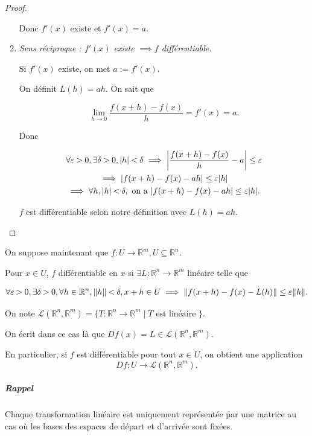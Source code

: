 \documentclass[french]{article}
\newcommand{\lesss}{\rotatebox[origin=c]{90}{$\land$}}
\newcommand{\less}{\ \lesss\ }
\newcommand{\biggg}{\rotatebox[origin=c]{90}{$\lor$}}
\newcommand{\bg}{\ \biggg\ }
\begin{document}
\begin{proof}
\begin{enumerate}
    Donc $f'(x)$ existe et $f'(x) = a$.

    \item \emph{Sens réciproque : $f'(x)$ existe $\implies f$ différentiable.}

    Si $f'(x)$ existe, on met $a :=f'(x)$.

    On définit $L(h) =ah$. On sait que

    $$ \lim_{h \to 0} \frac{f(x+h)-f(x)}{h} = f'(x) = a.$$

    Donc

    \begin{gather*}
      \forall \varepsilon \bg 0, \exists \delta  \bg 0, \lvert h \rvert \less \delta \implies \left\lvert \frac{f(x+h)-f(x)}{h} -a \right\rvert \leq \varepsilon  \\
      \implies \lvert f(x+h) -f(x) -ah \rvert \leq \varepsilon \lvert h \rvert \\
      \implies \forall h, \lvert h \rvert \less \delta, \text{ on a } \lvert f(x+h) - f(x) -ah \rvert \leq \varepsilon \lvert h \rvert.
    \end{gather*}

    $f$ est différentiable selon notre définition avec $L(h) =ah$.
  \end{enumerate}
\end{proof}


On suppose maintenant que $f:U \to \mathbb{R}^m, U \subseteq \mathbb{R}^n$.

Pour $x \in U$, $f$ différentiable en $x$ si $\exists L : \mathbb{R}^n \to \mathbb{R}^m$ linéaire telle que

\begin{gather*}
  \forall \varepsilon  \bg 0, \exists \delta  \bg 0, \forall h \in \mathbb{R}^n, \Vert h \Vert \less \delta, x+h \in U \implies \Vert f(x+h) -f(x)-L(h) \Vert \leq \varepsilon \Vert h \Vert.
\end{gather*}

On note $\mathscr{L}(\mathbb{R}^n, \mathbb{R}^m) = \{  T: \mathbb{R}^n \to \mathbb{R}^m \mid T \text{ est linéaire }   \} $.

On écrit dans ce cas là que $Df(x) = L \in \mathscr{L}(\mathbb{R}^n, \mathbb{R}^m)  $.

En particulier, si $f$ est différentiable pour tout $x \in U$, on obtient une application $$Df : U \to \mathscr{L}(\mathbb{R}^n, \mathbb{R}^m). $$

\subparagraph{Rappel} Chaque transformation linéaire est uniquement représentée par une matrice au cas où les bases des espaces de départ et d'arrivée sont fixées.
\end{document}
